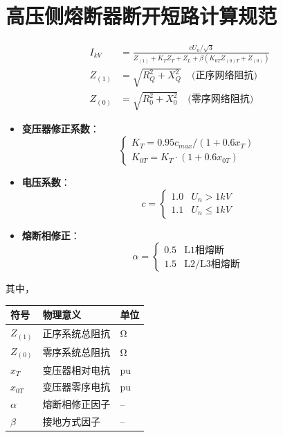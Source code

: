 \documentclass[a4paper,11pt,AutoFakeBold]{ctexart}
\begin{document}
\newpage
\section{高压侧熔断器断开短路计算规范}

\begin{align}
I_{kV} &= \frac{cU_n/\sqrt{3}}{Z_{(1)} + K_TZ_T + Z_L + \beta(K_{0T}Z_{(0)T} + Z_{(0)})} \label{eq:ikv} \\
Z_{(1)} &= \sqrt{R_{Q}^2 + X_{Q}^2} \quad \text{(正序网络阻抗)} \label{eq:z1} \\
Z_{(0)} &= \sqrt{R_{0}^2 + X_{0}^2} \quad \text{(零序网络阻抗)} \label{eq:z0}
\end{align}


\begin{itemize}
\item \textbf{变压器修正系数}：
  \[
  \begin{cases}
  K_T = 0.95c_{max}/(1 + 0.6x_T) \\
  K_{0T} = K_T \cdot (1 + 0.6x_{0T}) 
  \end{cases}
  \]
  
\item \textbf{电压系数}：
  \[
  c = 
  \begin{cases}
  1.0 & U_n > 1\si{kV} \\
  1.1 & U_n \leq 1\si{kV}
  \end{cases}
  \]
  
\item \textbf{熔断相修正}：
  \[
  \alpha = 
  \begin{cases}
  0.5 & \text{L1相熔断} \\
  1.5 & \text{L2/L3相熔断}
  \end{cases}
  \]
\end{itemize}

其中，

\begin{tabular}{lll}
符号 & 物理意义 & 单位 \\
\hline
$Z_{(1)}$ & 正序系统总阻抗 & \si{\ohm} \\
$Z_{(0)}$ & 零序系统总阻抗 & \si{\ohm} \\
$x_T$ & 变压器相对电抗 & \si{pu} \\
$x_{0T}$ & 变压器零序电抗 & \si{pu} \\
$\alpha$ & 熔断相修正因子 & -- \\
$\beta$ & 接地方式因子 & -- \\
\end{tabular}
\end{document}
